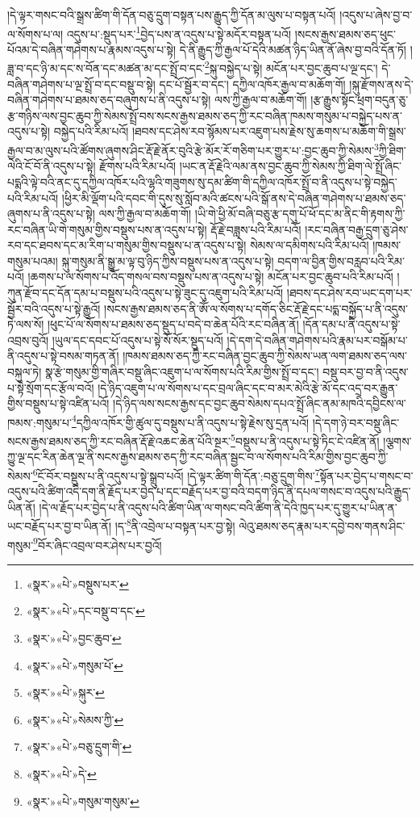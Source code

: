 །དེ་ལྟར་གསང་བའི་སྒྲས་ཚིག་གི་དོན་བཅུ་དྲུག་བསྟན་པས་རྒྱུད་ཀྱི་དོན་མ་ལུས་པ་བསྟན་པའོ། །འདུས་པ་ཞེས་བྱ་བ་ལ་སོགས་པ་ལ། འདུས་པ་:སྡུད་པར་\footnote{«སྣར་»«པེ་»བསྡུས་པར་}བྱེད་པས་ན་འདུས་པ་སྟེ་མདོར་བསྟན་པའོ། །སངས་རྒྱས་ཐམས་ཅད་ཕུང་པོའམ་དེ་བཞིན་གཤེགས་པ་རྣམས་འདུས་པ་སྟེ། དེ་ནི་རྒྱུད་ཀྱི་རྒྱལ་པོ་དེའི་མཚན་ཉིད་ཡིན་ནོ་ཞེས་བྱ་བའི་དོན་ཏོ། །ཟླ་བ་དང་ཉི་མ་དང་ས་བོན་དང་མཚན་མ་དང་སྤྲོ་བ་དང་\footnote{«སྣར་»«པེ་»དང་བསྡུ་བ་དང་}སྐུ་བསྐྱེད་པ་སྟེ། མངོན་པར་བྱང་ཆུབ་པ་ལྔ་དང་། དེ་བཞིན་གཤེགས་པ་ལྔ་སྤྲོ་བ་དང་བསྡུ་བ་སྟེ། དང་པོ་སྦྱོར་བ་དང་། དཀྱིལ་འཁོར་རྒྱལ་བ་མཆོག་གོ། །སྐུ་རྫོགས་ནས་དེ་བཞིན་གཤེགས་པ་ཐམས་ཅད་བཞུགས་པ་ནི་འདུས་པ་སྟེ། ལས་ཀྱི་རྒྱལ་བ་མཆོག་གོ། །རྩ་རྒྱུས་སྟོང་ཕྲག་བདུན་ཅུ་རྩ་གཉིས་ལས་བྱང་ཆུབ་ཀྱི་སེམས་སྤྲོ་བས་སངས་རྒྱས་ཐམས་ཅད་ཀྱི་རང་བཞིན་ཁམས་གསུམ་པ་བསྐྱེད་པས་ན་འདུས་པ་སྟེ། བསྐྱེད་པའི་རིམ་པའོ། །ཐབས་དང་ཤེས་རབ་སྙོམས་པར་འཇུག་པས་རྗེས་སུ་ཆགས་པ་མཆོག་གི་སྒྲས་རྒྱལ་བ་མ་ལུས་པའི་ཚོགས་ཞུགས་ཤིང་རྡོ་རྗེ་ནོར་བུའི་རྩེ་མོར་རོ་གཅིག་པར་གྱུར་པ་:བྱང་ཆུབ་ཀྱི་སེམས་\footnote{«སྣར་»«པེ་»བྱང་ཆུབ་}ཀྱི་ཐིག་ལེའི་ངོ་བོ་ནི་འདུས་པ་སྟེ། རྫོགས་པའི་རིམ་པའོ། །ཡང་ན་རྡོ་རྗེའི་ལམ་ནས་བྱང་ཆུབ་ཀྱི་སེམས་ཀྱི་ཐིག་ལེ་སྤྲོ་ཞིང་པདྨའི་ལྟེ་བའི་ནང་དུ་དཀྱིལ་འཁོར་པའི་ལྷའི་གཟུགས་སུ་དམ་ཚིག་གི་དཀྱིལ་འཁོར་སྤྲོ་བ་ནི་འདུས་པ་སྟེ་བསྐྱེད་པའི་རིམ་པའོ། །ཕྱིར་མི་ལྡོག་པའི་དབང་གི་དུས་སུ་སློབ་མའི་ཚངས་པའི་སྒོ་ནས་དེ་བཞིན་གཤེགས་པ་ཐམས་ཅད་ཞུགས་པ་ནི་འདུས་པ་སྟེ། ལས་ཀྱི་རྒྱལ་བ་མཆོག་གོ། །ཡི་གེ་ཕྱི་མོ་བཞི་བཅུ་རྩ་དགུ་པོ་ཕོ་དང་མ་ནིང་གི་རྟགས་ཀྱི་རང་བཞིན་ཡི་གེ་གསུམ་གྱིས་བསྡུས་པས་ན་འདུས་པ་སྟེ། རྡོ་རྗེ་བཟླས་པའི་རིམ་པའོ། །རང་བཞིན་བརྒྱ་དྲུག་ཅུ་ཤེས་རབ་དང་ཐབས་དང་མ་རིག་པ་གསུམ་གྱིས་བསྡུས་པ་ན་འདུས་པ་སྟེ། སེམས་ལ་དམིགས་པའི་རིམ་པའོ། །ཁམས་གསུམ་པའམ། སྐུ་གསུམ་ནི་སྒྱུ་མ་ལྟ་བུ་ཉིད་ཀྱིས་བསྡུས་པས་ན་འདུས་པ་སྟེ། བདག་ལ་བྱིན་གྱིས་བརླབ་པའི་རིམ་པའོ། །ཆགས་པ་ལ་སོགས་པ་འོད་གསལ་བས་བསྡུས་པས་ན་འདུས་པ་སྟེ། མངོན་པར་བྱང་ཆུབ་པའི་རིམ་པའོ། །ཀུན་རྫོབ་དང་དོན་དམ་པ་བསྡུས་པའི་འདུས་པ་སྟེ་ཟུང་དུ་འཇུག་པའི་རིམ་པའོ། །ཐབས་དང་ཤེས་རབ་ཡང་དག་པར་སྦྱོར་བའི་འདུས་པ་སྟེ་རྒྱུའོ། །སངས་རྒྱས་ཐམས་ཅད་ནི་ཨོཾ་ལ་སོགས་པ་དགོད་ཅིང་རྡོ་རྗེ་དང་པདྨ་བསྐྱོད་པ་ནི་འདུས་ཏེ་ལས་སོ། །ཕུང་པོ་ལ་སོགས་པ་ཐམས་ཅད་སྡུད་པ་བདེ་བ་ཆེན་པོའི་རང་བཞིན་ནོ། །དོན་དམ་པ་ནི་འདུས་པ་སྟེ་འབྲས་བུའོ། །ཡུལ་དང་དབང་པོ་འདུས་པ་སྟེ་སོ་སོར་སྡུད་པའོ། །དེ་དག་དེ་བཞིན་གཤེགས་པའི་རྣམ་པར་བསྒོམ་པ་ནི་འདུས་པ་སྟེ་བསམ་གཏན་ནོ། །ཁམས་ཐམས་ཅད་ཀྱི་རང་བཞིན་བྱང་ཆུབ་ཀྱི་སེམས་ཡན་ལག་ཐམས་ཅད་ལས་བསྐུལ་ཏེ། སྣ་རྩེ་གསུམ་གྱི་གཞིར་བསྡུ་ཞིང་འཇུག་པ་ལ་སོགས་པའི་རིམ་གྱིས་སྤྲོ་བ་དང་། བསྡུ་བར་བྱ་བ་ནི་འདུས་པ་སྟེ་སྲོག་དང་རྩོལ་བའོ། །དེ་ཉིད་འཇུག་པ་ལ་སོགས་པ་དང་བྲལ་ཞིང་དང་བ་མར་མེའི་རྩེ་མོ་དང་འདྲ་བར་རྒྱུན་གྱིས་བསྡུས་པ་སྟེ་འཛིན་པའོ། །དེ་ཉིད་ལས་སངས་རྒྱས་དང་བྱང་ཆུབ་སེམས་དཔའ་སྤྲོ་ཞིང་ནམ་མཁའི་དབྱིངས་ལ་ཁམས་:གསུམ་པ་\footnote{«སྣར་»«པེ་»གསུམ་པོ་}དཀྱིལ་འཁོར་གྱི་ཚུལ་དུ་བསྡུས་པ་ནི་འདུས་པ་སྟེ་རྗེས་སུ་དྲན་པའོ། །དེ་དག་ཉེ་བར་བསྡུ་ཞིང་སངས་རྒྱས་ཐམས་ཅད་ཀྱི་རང་བཞིན་རྡོ་རྗེ་འཆང་ཆེན་པོའི་སྔར་\footnote{«སྣར་»«པེ་»སྐུར་}བསྡུས་པ་ནི་འདུས་པ་སྟེ་ཏིང་ངེ་འཛིན་ནོ། །ལྕགས་ཀྱུ་ལྔ་དང་རིན་ཆེན་ལྔ་ནི་སངས་རྒྱས་ཐམས་ཅད་ཀྱི་རང་བཞིན་སྦྱང་བ་ལ་སོགས་པའི་རིམ་གྱིས་བྱང་ཆུབ་ཀྱི་སེམས་\footnote{«སྣར་»«པེ་»སེམས་ཀྱི་}ངོ་བོར་བསྡུས་པ་ནི་འདུས་པ་སྟེ་སྒྲུབ་པའོ། །དེ་ལྟར་ཚིག་གི་དོན་:བཅུ་དྲུག་གིས་\footnote{«སྣར་»«པེ་»བཅུ་དྲུག་གི་}སྟོན་པར་བྱེད་པ་གསང་བ་འདུས་པའི་ཚིག་འདི་དག་ནི་རྗོད་པར་བྱེད་པ་དང་བརྗོད་པར་བྱ་བའི་བདག་ཉིད་ནི་དཔལ་གསང་བ་འདུས་པའི་རྒྱུད་ཡིན་ནོ། །དེ་ལ་རྗོད་པར་བྱེད་པ་ནི་འདུས་པའི་ཚིག་ཡིན་ལ་གསང་བའི་ཚིག་ནི་དེའི་ཁྱད་པར་དུ་གྱུར་པ་ཡིན་ན་ཡང་བརྗོད་པར་བྱ་བ་ཡིན་ནོ། །ད་\footnote{«སྣར་»«པེ་»དེ་}ནི་འབྲེལ་པ་བསྟན་པར་བྱ་སྟེ། ལེའུ་ཐམས་ཅད་རྣམ་པར་དབྱེ་བས་གནས་ཤིང་གསུམ་\footnote{«སྣར་»«པེ་»གསུམ་གསུམ་}བོར་ཞིང་འབྲལ་བར་ཤེས་པར་བྱའོ། 